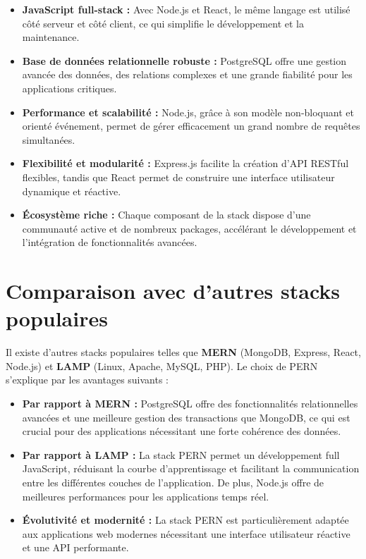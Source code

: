 \documentclass[12pt,a4paper]{report}
\begin{document}
\begin{itemize}
    \item \textbf{JavaScript full-stack :} Avec Node.js et React, le même langage est utilisé côté serveur et côté client, ce qui simplifie le développement et la maintenance.
    \item \textbf{Base de données relationnelle robuste :} PostgreSQL offre une gestion avancée des données, des relations complexes et une grande fiabilité pour les applications critiques.
    \item \textbf{Performance et scalabilité :} Node.js, grâce à son modèle non-bloquant et orienté événement, permet de gérer efficacement un grand nombre de requêtes simultanées.
    \item \textbf{Flexibilité et modularité :} Express.js facilite la création d’API RESTful flexibles, tandis que React permet de construire une interface utilisateur dynamique et réactive.
    \item \textbf{Écosystème riche :} Chaque composant de la stack dispose d’une communauté active et de nombreux packages, accélérant le développement et l’intégration de fonctionnalités avancées.
\end{itemize}

\section*{Comparaison avec d’autres stacks populaires}

Il existe d’autres stacks populaires telles que \textbf{MERN} (MongoDB, Express, React, Node.js) et \textbf{LAMP} (Linux, Apache, MySQL, PHP). Le choix de PERN s’explique par les avantages suivants :

\begin{itemize}
    \item \textbf{Par rapport à MERN :} PostgreSQL offre des fonctionnalités relationnelles avancées et une meilleure gestion des transactions que MongoDB, ce qui est crucial pour des applications nécessitant une forte cohérence des données.
    \item \textbf{Par rapport à LAMP :} La stack PERN permet un développement full JavaScript, réduisant la courbe d’apprentissage et facilitant la communication entre les différentes couches de l’application. De plus, Node.js offre de meilleures performances pour les applications temps réel.
    \item \textbf{Évolutivité et modernité :} La stack PERN est particulièrement adaptée aux applications web modernes nécessitant une interface utilisateur réactive et une API performante.
\end{itemize}
\end{document}
